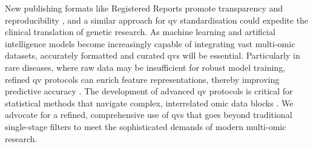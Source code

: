 New publishing formats like Registered Reports promote transparency and reproducibility \cite{chambers2014instead}, and a similar approach for \ac{qv} standardisation could expedite the clinical translation of genetic research. As machine learning and artificial intelligence models become increasingly capable of integrating vast multi-omic datasets, accurately formatted and curated \ac{qv}s will be essential. Particularly in rare diseases, where raw data may be insufficient for robust model training, refined \ac{qv} protocols can enrich feature representations, thereby improving predictive accuracy
\cite{barto2020looking}. 
The development of advanced \ac{qv} protocols is critical for statistical methods that navigate complex, interrelated omic data blocks \cite{smilde_multiblock_2022}. We advocate for a refined, comprehensive use of \ac{qv}s that goes beyond traditional single-stage filters to meet the sophisticated demands of modern multi-omic research.

